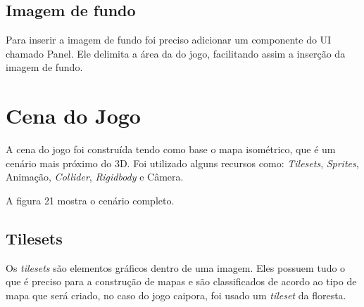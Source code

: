 \subsection{Imagem de fundo}
Para inserir a imagem de fundo foi preciso adicionar um componente do UI chamado Panel. Ele delimita a área da do jogo, facilitando assim a inserção da imagem de fundo.

\section{Cena do Jogo}
A cena do jogo foi construída tendo como base o mapa isométrico, que é um cenário mais próximo do 3D. Foi utilizado alguns recursos como: \textit{Tilesets}, \textit{Sprites}, Animação, \textit{Collider}, \textit{Rigidbody} e Câmera.

A figura 21 mostra o cenário completo.

\begin{figure}[h!]
		\centering
	\end{figure}

\subsection{Tilesets}
Os \textit{tilesets} são elementos gráficos dentro de uma imagem. Eles possuem tudo o que é preciso para a construção de mapas e são classificados de acordo ao tipo de mapa que será criado, no caso do jogo caipora, foi usado um \textit{tileset} da floresta.

